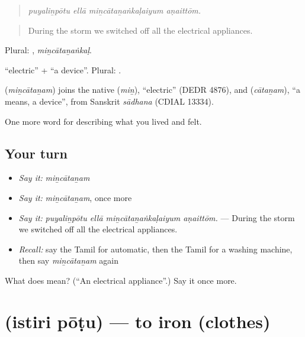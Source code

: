 \begin{quote}
\emph{puyaliṉpōtu ellā miṉcātaṉaṅkaḷaiyum aṇaittōm.}
\end{quote}

\begin{quote}
During the storm we switched off all the electrical appliances.
\end{quote}

Plural: , \emph{miṉcātaṉaṅkaḷ}.

 \textquotedblleft{}electric\textquotedblright{} +  \textquotedblleft{}a device\textquotedblright{}. Plural: .

\begin{cousinweb}
\textbf{} (\emph{miṉcātaṉam}) joins the native  (\emph{miṉ}), \textquotedblleft{}electric\textquotedblright{} (DEDR 4876), and  (\emph{cātaṉam}), \textquotedblleft{}a means, a device\textquotedblright{}, from Sanskrit \emph{sādhana} (CDIAL 13334).
\end{cousinweb}

\begin{grammarlens}[title={What you've built}]
One more word for describing what you lived and felt.
\end{grammarlens}

\subsection*{Your turn}
\begin{itemize}
\raggedright
  \item \emph{Say it:} \emph{miṉcātaṉam}
  \item \emph{Say it:} \emph{miṉcātaṉam}, once more
  \item \emph{Say it:} \emph{puyaliṉpōtu ellā miṉcātaṉaṅkaḷaiyum aṇaittōm.} — During the storm we switched off all the electrical appliances.
  \item \emph{Recall:} say the Tamil for automatic, then the Tamil for a washing machine, then say \emph{miṉcātaṉam} again
\end{itemize}

\begin{tcolorbox}[breakable,colback=teal!4,colframe=teal!35!black,title={Before you move on}]
What does  mean? (\textquotedblleft{}An electrical appliance\textquotedblright{}.) Say it once more.
\end{tcolorbox}
\section[\texorpdfstring{\ta{இஸ்திரி} \ta{போடு} (istiri pōṭu)}{இஸ்திரி போடு (istiri pōṭu)}]{  (istiri pōṭu) — to iron (clothes)}

